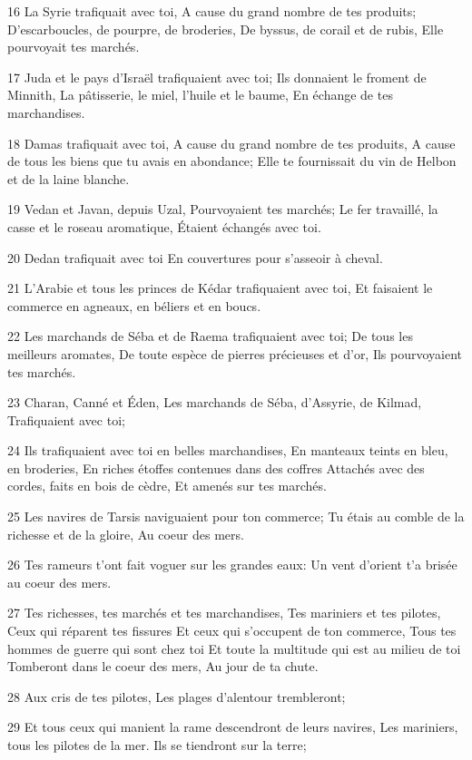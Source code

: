 \par 16 La Syrie trafiquait avec toi, A cause du grand nombre de tes produits; D'escarboucles, de pourpre, de broderies, De byssus, de corail et de rubis, Elle pourvoyait tes marchés.
\par 17 Juda et le pays d'Israël trafiquaient avec toi; Ils donnaient le froment de Minnith, La pâtisserie, le miel, l'huile et le baume, En échange de tes marchandises.
\par 18 Damas trafiquait avec toi, A cause du grand nombre de tes produits, A cause de tous les biens que tu avais en abondance; Elle te fournissait du vin de Helbon et de la laine blanche.
\par 19 Vedan et Javan, depuis Uzal, Pourvoyaient tes marchés; Le fer travaillé, la casse et le roseau aromatique, Étaient échangés avec toi.
\par 20 Dedan trafiquait avec toi En couvertures pour s'asseoir à cheval.
\par 21 L'Arabie et tous les princes de Kédar trafiquaient avec toi, Et faisaient le commerce en agneaux, en béliers et en boucs.
\par 22 Les marchands de Séba et de Raema trafiquaient avec toi; De tous les meilleurs aromates, De toute espèce de pierres précieuses et d'or, Ils pourvoyaient tes marchés.
\par 23 Charan, Canné et Éden, Les marchands de Séba, d'Assyrie, de Kilmad, Trafiquaient avec toi;
\par 24 Ils trafiquaient avec toi en belles marchandises, En manteaux teints en bleu, en broderies, En riches étoffes contenues dans des coffres Attachés avec des cordes, faits en bois de cèdre, Et amenés sur tes marchés.
\par 25 Les navires de Tarsis naviguaient pour ton commerce; Tu étais au comble de la richesse et de la gloire, Au coeur des mers.
\par 26 Tes rameurs t'ont fait voguer sur les grandes eaux: Un vent d'orient t'a brisée au coeur des mers.
\par 27 Tes richesses, tes marchés et tes marchandises, Tes mariniers et tes pilotes, Ceux qui réparent tes fissures Et ceux qui s'occupent de ton commerce, Tous tes hommes de guerre qui sont chez toi Et toute la multitude qui est au milieu de toi Tomberont dans le coeur des mers, Au jour de ta chute.
\par 28 Aux cris de tes pilotes, Les plages d'alentour trembleront;
\par 29 Et tous ceux qui manient la rame descendront de leurs navires, Les mariniers, tous les pilotes de la mer. Ils se tiendront sur la terre;
